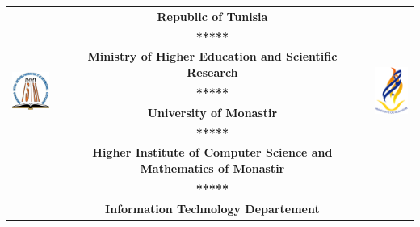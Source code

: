 \begin{titlepage}
    \begin{center}
        \renewcommand\arraystretch{1}
        \fontsize{9}{0.9\baselineskip}\selectfont
        \begin{tabular}{ l c r }
            \multirow[c]{7}{*}{\includegraphics[width=64px]{src/assets/logos/isimm.png}} & \textbf{Republic of Tunisia}                                              & \multirow[c]{7}{*}{\includegraphics[width=56px, height=64px]{src/assets/logos/um.png}} \\
                                                                         & \textbf{*****}                                                                                                                                     \\
                                                                         & \textbf{Ministry of Higher Education and Scientific Research}                                                                                      \\
                                                                         & \textbf{*****}                                                                                                                                     \\
                                                                         & \textbf{University of Monastir}                                                                                                                    \\
                                                                         & \textbf{*****}                                                                                                                                     \\
                                                                         & \textbf{Higher Institute of Computer Science and Mathematics of Monastir}                                                                          \\
                                                                         & \textbf{*****}                                                                                                                                     \\
                                                                         & \textbf{Information Technology Departement}                                                                                                        \\
        \end{tabular}


\end{center}
\end{titlepage}
